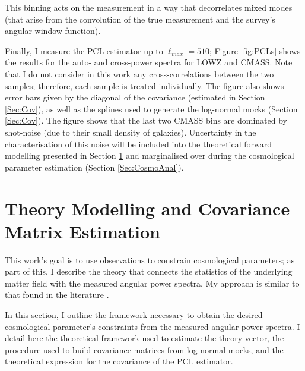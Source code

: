 
\noindent This binning acts on the measurement in a way that decorrelates mixed modes (that arise from the convolution of the true measurement and the survey's angular window function). 

\qquad Finally, I measure the PCL estimator up to $\ell_{max} = 510$; Figure \ref{fig:PCLs} shows the results for the auto- and cross-power spectra for LOWZ and CMASS. Note that I do not consider in this work any cross-correlations between the two samples; therefore, each sample is treated individually. The figure also shows error bars given by the diagonal of the covariance (estimated in Section \ref{Sec:Cov}), as well as the splines used to generate the log-normal mocks (Section \ref{Sec:Cov}). The figure shows that the last two CMASS bins are dominated by shot-noise (due to their small density of galaxies). Uncertainty in the characterisation of this noise will be included into the theoretical forward modelling presented in Section \ref{Sec:Theory} and marginalised over during the cosmological parameter estimation (Section \ref{Sec:CosmoAnal}).



\section{Theory Modelling and Covariance Matrix Estimation}\label{Sec:Theory}
This work's goal is to use observations to constrain cosmological parameters; as part of this, I describe the theory that connects the statistics of the underlying matter field with the measured angular power spectra. My approach is similar to that found in the literature \citep{ScharfLahav1992,2001Huterer,Padm2007,Thomas2011,Asorey2012}.

\qquad In this section, I outline the framework necessary to obtain the desired cosmological parameter's constraints from the measured angular power spectra.  I detail here the theoretical framework used to estimate the theory vector, the procedure used to build covariance matrices from log-normal mocks, and the theoretical expression for the covariance of the PCL estimator.

